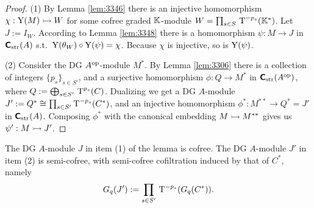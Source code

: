 \begin{proof} \mbox{}

\smallskip \noindent
(1) By Lemma \ref{lem:3346} there is an injective homomorphism 
$\chi : \operatorname{Y}(M) \rightarrowtail W$ 
for some cofree graded $\mathbb{K}$-module 
$W = \prod_{s \in S} \, \operatorname{T}^{-p_s}(\mathbb{K}^*)$.
Let $J := I_W$. 
According to Lemma \ref{lem:3348} there is a homomorphism 
$\psi : M \to J$ in $\boldsymbol{\mathsf{C}}_{\mathrm{str}}(A)$ s.t.\ 
$\operatorname{Y}(\theta_W) \circ \operatorname{Y}(\psi) = \chi$. Because $\chi$ is injective, so is
$\operatorname{Y}(\psi)$. 

\medskip \noindent
(2) Consider the DG $A^{\mathrm{op}}$-module $M^*$. By Lemma \ref{lem:3306}
there is a collection of integers $\{ p_s \}_{s \in S'}$,
and a surjective homomorphism
$\phi : Q \to M^*$
in $\boldsymbol{\mathsf{C}}_{\mathrm{str}}(A^{\mathrm{op}})$,
where 
$Q := \bigoplus\nolimits_{s \in S'} \, \operatorname{T}^{p_s}(C)$. 
Dualizing we get a DG $A$-module 
$J' := Q^* \cong  \prod_{s \in S'} \operatorname{T}^{-p_s}(C^*)$, 
and an injective homomorphism
$\phi^* : M^{**} \to Q^* = J'$
in $\boldsymbol{\mathsf{C}}_{\mathrm{str}}(A)$.
Composing $\phi^*$ with the canonical embedding 
$M \rightarrowtail M^{**}$ gives us $\psi' : M \rightarrowtail J'$. 
\end{proof}

The DG $A$-module $J$ in item (1) of the lemma is cofree. The DG $A$-module 
$J'$ in item (2) is semi-cofree, with semi-cofree cofiltration induced by that 
of $C^*$, namely 
\begin{equation} \label{eqn:3326}
G_{q}(J') :=  \prod_{s \in S'} \, \operatorname{T}^{-p_s}(G_q(C^*)) .
\end{equation}


